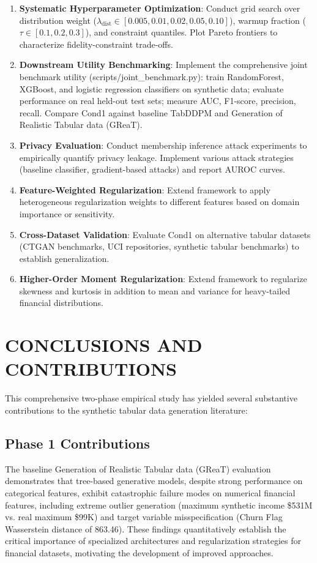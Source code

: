\documentclass[10pt,conference,a4paper]{IEEEtran}
\begin{document}
\begin{enumerate}
    \item \textbf{Systematic Hyperparameter Optimization}: Conduct grid search over distribution weight ($\lambda_{\text{dist}} \in [0.005, 0.01, 0.02, 0.05, 0.10]$), warmup fraction ($\tau \in [0.1, 0.2, 0.3]$), and constraint quantiles. Plot Pareto frontiers to characterize fidelity-constraint trade-offs.
    
    \item \textbf{Downstream Utility Benchmarking}: Implement the comprehensive joint benchmark utility (scripts/joint\_benchmark.py): train RandomForest, XGBoost, and logistic regression classifiers on synthetic data; evaluate performance on real held-out test sets; measure AUC, F1-score, precision, recall. Compare Cond1 against baseline TabDDPM and Generation of Realistic Tabular data (GReaT).
    
    \item \textbf{Privacy Evaluation}: Conduct membership inference attack experiments to empirically quantify privacy leakage. Implement various attack strategies (baseline classifier, gradient-based attacks) and report AUROC curves.
    
    \item \textbf{Feature-Weighted Regularization}: Extend framework to apply heterogeneous regularization weights to different features based on domain importance or sensitivity.
    
    \item \textbf{Cross-Dataset Validation}: Evaluate Cond1 on alternative tabular datasets (CTGAN benchmarks, UCI repositories, synthetic tabular benchmarks) to establish generalization.
    
    \item \textbf{Higher-Order Moment Regularization}: Extend framework to regularize skewness and kurtosis in addition to mean and variance for heavy-tailed financial distributions.
\end{enumerate}

\section{CONCLUSIONS AND CONTRIBUTIONS}

This comprehensive two-phase empirical study has yielded several substantive contributions to the synthetic tabular data generation literature:

\subsection{Phase 1 Contributions}
The baseline Generation of Realistic Tabular data (GReaT) evaluation demonstrates that tree-based generative models, despite strong performance on categorical features, exhibit catastrophic failure modes on numerical financial features, including extreme outlier generation (maximum synthetic income \$531M vs. real maximum \$99K) and target variable misspecification (Churn Flag Wasserstein distance of 863.46). These findings quantitatively establish the critical importance of specialized architectures and regularization strategies for financial datasets, motivating the development of improved approaches.
\end{document}
